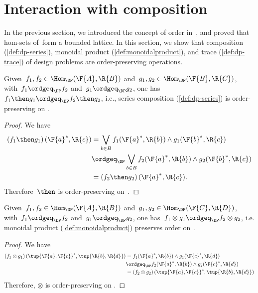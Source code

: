 

\section{Interaction with composition}


In the previous section, we introduced the concept of order in~\DP, and proved that hom-sets of~\DP form a bounded lattice. In this section, we show that composition (\cref{def:dp-series}), monoidal product (\cref{def:monoidalproduct}), and trace (\cref{def:dp-trace}) of design problems are order-preserving operations.
\begin{lemma}
    Given~$f_1,f_2 \in \Hom_\DP(\F{A},\R{B})$ and~$g_1,g_2 \in \Hom_\DP(\F{B},\R{C})$, with~$f_1\ordgeq_\DP f_2$ and~$g_1\ordgeq_\DP g_2$, one has~$f_1\then g_1 \ordgeq_\DP f_2\then g_2$, i.e., series composition (\cref{def:dp-series}) is order-preserving on \DP.
\end{lemma}

\begin{proof}
    We have
    \begin{equation}
        \begin{aligned}
            \left( f_1\then g_1\right)(\F{a}^*,\R{c})&=\bigvee_{b\in B}f_1(\F{a}^*,\R{b})\wedge g_1(\F{b}^*,\R{c})\\
            &\ordgeq_\DP \bigvee_{b\in B} f_2(\F{a}^*,\R{b})\wedge g_2(\F{b}^*,\R{c})\\
            &=\left( f_2\then g_2\right)(\F{a}^*,\R{c}).
        \end{aligned}
    \end{equation}
    Therefore~$\then$ is order-preserving on~\DP.
\end{proof}

\begin{lemma}
    Given~$f_1,f_2 \in \Hom_\DP(\F{A},\R{B})$ and~$g_1,g_2 \in \Hom_\DP(\F{C},\R{D})$, with~$f_1\ordgeq_\DP f_2$ and~$g_1\ordgeq_\DP g_2$, one has~$f_1\otimes g_1 \ordgeq_\DP f_2\otimes g_2$, i.e. monoidal product (\cref{def:monoidalproduct}) preserves order on~\DP.
\end{lemma}

\begin{proof}
    We have
    \begin{equation}
        \begin{aligned}
            \left( f_1\otimes g_1\right) (\tup{\F{a},\F{c}}^*,\tup{\R{b},\R{d}})&=f_1(\F{a}^*,\R{b})\wedge g_1(\F{c}^*,\R{d})\\
            &\ordgeq_\DP f_2(\F{a}^*,\R{b})\wedge g_2(\F{c}^*,\R{d})\\
            &=\left( f_2\otimes g_2\right) (\tup{\F{a},\F{c}}^*,\tup{\R{b},\R{d}})
        \end{aligned}
    \end{equation}
    Therefore, $\otimes$ is order-preserving on \DP.
\end{proof}

